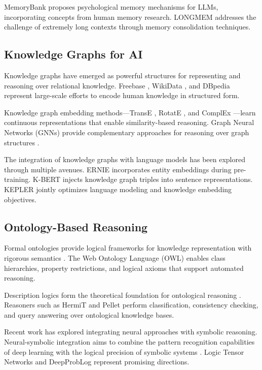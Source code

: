 \documentclass[conference]{IEEEtran}
\begin{document}
MemoryBank \cite{zhong2023memorybank} proposes psychological memory mechanisms for LLMs, incorporating concepts from human memory research. LONGMEM \cite{wang2023longmem} addresses the challenge of extremely long contexts through memory consolidation techniques.

\subsection{Knowledge Graphs for AI}

Knowledge graphs have emerged as powerful structures for representing and reasoning over relational knowledge. Freebase \cite{bollacker2008freebase}, WikiData \cite{vrandecic2014wikidata}, and DBpedia \cite{auer2007dbpedia} represent large-scale efforts to encode human knowledge in structured form.

Knowledge graph embedding methods—TransE \cite{bordes2013translating}, RotatE \cite{sun2019rotate}, and ComplEx \cite{trouillon2016complex}—learn continuous representations that enable similarity-based reasoning. Graph Neural Networks (GNNs) provide complementary approaches for reasoning over graph structures \cite{schlichtkrull2018modeling}.

The integration of knowledge graphs with language models has been explored through multiple avenues. ERNIE \cite{zhang2019ernie} incorporates entity embeddings during pre-training. K-BERT \cite{liu2020k} injects knowledge graph triples into sentence representations. KEPLER \cite{wang2021kepler} jointly optimizes language modeling and knowledge embedding objectives.

\subsection{Ontology-Based Reasoning}

Formal ontologies provide logical frameworks for knowledge representation with rigorous semantics \cite{gruber1993translation}. The Web Ontology Language (OWL) \cite{mcguinness2004owl} enables class hierarchies, property restrictions, and logical axioms that support automated reasoning.

Description logics form the theoretical foundation for ontological reasoning \cite{baader2003description}. Reasoners such as HermiT \cite{glimm2014hermit} and Pellet \cite{sirin2007pellet} perform classification, consistency checking, and query answering over ontological knowledge bases.

Recent work has explored integrating neural approaches with symbolic reasoning. Neural-symbolic integration aims to combine the pattern recognition capabilities of deep learning with the logical precision of symbolic systems \cite{garcez2019neural}. Logic Tensor Networks \cite{serafini2016logic} and DeepProbLog \cite{manhaeve2018deepproblog} represent promising directions.
\end{document}
